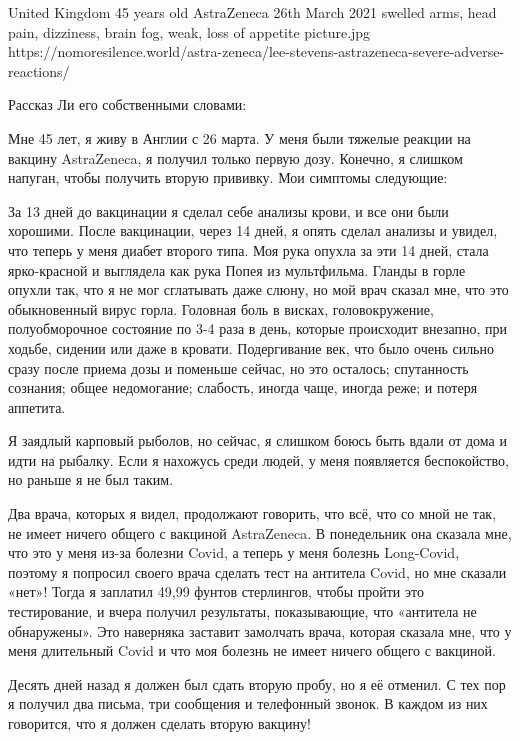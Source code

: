 {United Kingdom}
{45 years old}
{AstraZeneca}
{26th March 2021}
{swelled arms, head pain, dizziness, brain fog, weak, loss of appetite}
{picture.jpg}
{https://nomoresilence.world/astra-zeneca/lee-stevens-astrazeneca-severe-adverse-reactions/}
{

Рассказ Ли его собственными словами:

Мне 45 лет, я живу в Англии с 26 марта. У меня были тяжелые реакции на вакцину
AstraZeneca, я получил только первую дозу. Конечно, я слишком напуган, чтобы
получить вторую прививку. Мои симптомы следующие:

За 13 дней до вакцинации я сделал себе анализы крови, и все они были
хорошими. После вакцинации, через 14 дней, я опять сделал анализы и увидел, что
теперь у меня диабет второго типа. Моя рука опухла за эти 14 дней, стала
ярко-красной и выглядела как рука Попея из мультфильма. Гланды в горле опухли
так, что я не мог сглатывать даже слюну, но мой врач сказал мне, что это
обыкновенный вирус горла. Головная боль в висках, головокружение, полуобморочное
состояние по 3-4 раза в день, которые происходит внезапно, при ходьбе, сидении
или даже в кровати. Подергивание век, что было очень сильно сразу после приема
дозы и поменьше сейчас, но это осталось; спутанность сознания; общее
недомогание; слабость, иногда чаще, иногда реже; и потеря аппетита.

Я заядлый карповый рыболов, но сейчас, я слишком боюсь быть вдали от дома и идти
на рыбалку. Если я нахожусь среди людей, у меня появляется беспокойство, но
раньше я не был таким.

Два врача, которых я видел, продолжают говорить, что всё, что со мной не так, не
имеет ничего общего с вакциной AstraZeneca. В понедельник она сказала мне, что
это у меня из-за болезни Covid, а теперь у меня болезнь Long-Covid, поэтому я
попросил своего врача сделать тест на антитела Covid, но мне сказали «нет»!
Тогда я заплатил 49,99 фунтов стерлингов, чтобы пройти это тестирование, и вчера
получил результаты, показывающие, что «антитела не обнаружены». Это наверняка
заставит замолчать врача, которая сказала мне, что у меня длительный Covid и что
моя болезнь не имеет ничего общего с вакциной.

Десять дней назад я должен был сдать вторую пробу, но я её отменил. С тех пор я
получил два письма, три сообщения и телефонный звонок. В каждом из них
говорится, что я должен сделать вторую вакцину!

}
